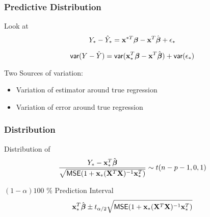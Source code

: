 \documentclass[handout]{beamer}
\begin{document}
\begin{frame}\frametitle{Predictive Distribution}
Look at  
 $$Y_* -\hat{Y}_*  = \mathbf{x}^{*T} \boldsymbol{\beta} - \mathbf{x}^T\hat{\boldsymbol{\beta}} + \epsilon_*$$ \pause

 $$\textsf{var}(Y -\hat{Y})  = \textsf{var}(\mathbf{x}_*^{T} \boldsymbol{\beta} - \mathbf{x}^T\hat{\boldsymbol{\beta}}) +
 \textsf{var}(\epsilon_*)$$ \pause

\vfill
Two Sources of variation:
\begin{itemize}
\item Variation of estimator around true regression \pause
\item Variation of error around true regression \pause
\end{itemize}
\end{frame}
\begin{frame}\frametitle{Distribution}
Distribution of 
$$ \frac{Y_* - \mathbf{x}_*^T\hat{\boldsymbol{\beta}}}{
\sqrt{\textsf{MSE} (1 + \mathbf{x}_*(\mathbf{X}^T\mathbf{X})^{-1}\mathbf{x}_*^T)}} \sim t(n - p - 1, 0, 1)
$$  
\vfill

$(1 - \alpha) 100$ \% Prediction Interval 
 $$\mathbf{x}_*^T \hat{\boldsymbol{\beta}} \pm  t_{\alpha/2} \sqrt{\textsf{MSE} (1 + \mathbf{x}_*(\mathbf{X}^T\mathbf{X})^{-1}\mathbf{x}_*^T)}$$
\end{frame}
\end{document}
